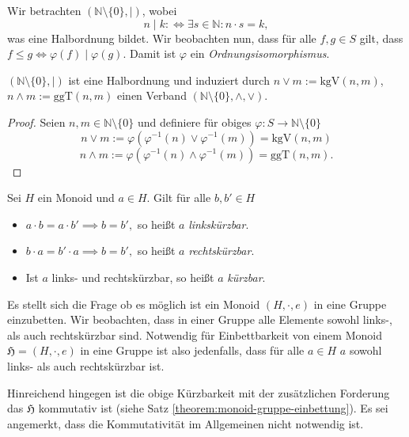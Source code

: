 \begin{remark}
    Wir betrachten $(\mathbb{N} \setminus \{ 0 \}, \mid)$, wobei
    $$ n \mid k :\Leftrightarrow \exists s \in \mathbb{N}: n \cdot s = k, $$
    was eine Halbordnung bildet. Wir beobachten nun, dass für alle $f,g \in S$ gilt, dass $f \leq g \Leftrightarrow \varphi(f) \mid \varphi(g)$. Damit ist $\varphi$ ein \emph{Ordnungsisomorphismus}.
\end{remark}

\begin{corollary}
    $(\mathbb{N}\setminus\{0\}, \mid)$ ist eine Halbordnung und induziert durch $n\lor m:=\mathrm{kgV}(n,m)$, $n\land m:=\mathrm{ggT}(n,m)$ einen Verband $(\mathbb{N}\setminus\{0\},\land,\lor)$.
\end{corollary}

\begin{proof}
    Seien $n,m \in \mathbb{N} \setminus \{0\}$ und definiere für obiges $\varphi:S \to \mathbb{N}\setminus\{0\}$
    $$ n \vee m := \varphi(\varphi^{-1}(n) \vee \varphi^{-1}(m)) = \textrm{kgV}(n,m) $$
    $$ n \wedge m := \varphi(\varphi^{-1}(n) \wedge \varphi^{-1}(m)) = \textrm{ggT}(n,m). $$
\end{proof}

\begin{definition}
    Sei $H$ ein Monoid und $a \in H$. Gilt für alle $b, b' \in H$
    \begin{itemize}
        \item $ a \cdot b = a \cdot b' \implies b = b', $ so heißt $a$ \emph{linkskürzbar}.
        \item $ b \cdot a = b' \cdot a \implies b = b', $ so heißt $a$ \emph{rechtskürzbar}.
        \item Ist $a$ links- und rechtskürzbar, so heißt $a$ \emph{kürzbar}.
    \end{itemize}
\end{definition}

\begin{remark}
    Es stellt sich die Frage ob es möglich ist ein Monoid $(H, \cdot, e)$ in eine Gruppe einzubetten. Wir beobachten, dass in einer Gruppe alle Elemente sowohl links-, als auch rechtskürzbar sind. Notwendig für Einbettbarkeit von einem Monoid $\mathfrak{H} = (H, \cdot, e)$ in eine Gruppe ist also jedenfalls, dass für alle $a \in H$ $a$ sowohl links- als auch rechtskürzbar ist.

    Hinreichend hingegen ist die obige Kürzbarkeit mit der zusätzlichen Forderung das $\mathfrak{H}$ kommutativ ist (siehe Satz \ref{theorem:monoid-gruppe-einbettung}). Es sei angemerkt, dass die Kommutativität im Allgemeinen nicht notwendig ist.
\end{remark}

